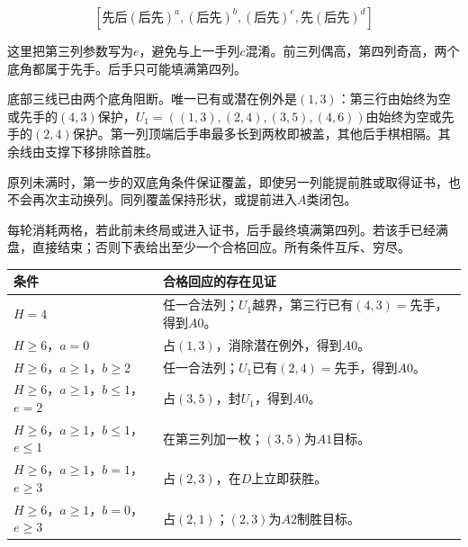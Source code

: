 \documentclass[
  a4paper,
]{article}
\newcounter{none} %
\begin{document}
\[[\text{先后}(\text{后先})^a,(\text{后先})^b,(\text{后先})^e,\text{先}(\text{后先})^d]\]

这里把第三列参数写为\(e\)，避免与上一手列\(c\)混淆。前三列偶高，第四列奇高，两个底角都属于先手。后手只可能填满第四列。

底部三线已由两个底角阻断。唯一已有或潜在例外是\((1,3)\)：第三行由始终为空或先手的\((4,3)\)保护，\(U_1=((1,3),(2,4),(3,5),(4,6))\)由始终为空或先手的\((2,4)\)保护。第一列顶端后手串最多长到两枚即被盖，其他后手棋相隔。其余线由支撑下移排除首胜。

原列未满时，第一步的双底角条件保证覆盖，即使另一列能提前胜或取得证书，也不会再次主动换列。同列覆盖保持形状，或提前进入\(A\)类闭包。

每轮消耗两格，若此前未终局或进入证书，后手最终填满第四列。若该手已经满盘，直接结束；否则下表给出至少一个合格回应。所有条件互斥、穷尽。

{\def\LTcaptype{none} %
\begin{longtable}[]{@{}
  >{\raggedright\arraybackslash}p{}
  >{\raggedright\arraybackslash}p{}@{}}
\toprule\noalign{}
\begin{minipage}[b]{\linewidth}\raggedright
条件
\end{minipage} & \begin{minipage}[b]{\linewidth}\raggedright
合格回应的存在见证
\end{minipage} \\
\midrule\noalign{}
\endhead
\bottomrule\noalign{}
\endlastfoot
\(H=4\) &
任一合法列；\(U_1\)越界，第三行已有\((4,3)=\text{先手}\)，得到\(A0\)。 \\
\(H\ge 6\)，\(a=0\) & 占\((1,3)\)，消除潜在例外，得到\(A0\)。 \\
\(H\ge 6\)，\(a\ge 1\)，\(b\ge 2\) &
任一合法列；\(U_1\)已有\((2,4)=\text{先手}\)，得到\(A0\)。 \\
\(H\ge 6\)，\(a\ge 1\)，\(b\le 1\)，\(e=2\) &
占\((3,5)\)，封\(U_1\)，得到\(A0\)。 \\
\(H\ge 6\)，\(a\ge 1\)，\(b\le 1\)，\(e\le 1\) &
在第三列加一枚；\((3,5)\)为\(A1\)目标。 \\
\(H\ge 6\)，\(a\ge 1\)，\(b=1\)，\(e\ge 3\) &
占\((2,3)\)，在\(D\)上立即获胜。 \\
\(H\ge 6\)，\(a\ge 1\)，\(b=0\)，\(e\ge 3\) &
占\((2,1)\)；\((2,3)\)为\(A2\)制胜目标。 \\
\end{longtable}
}
\end{document}
